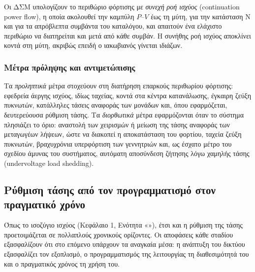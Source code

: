 Οι ΔΣΜ υπολογίζουν το περιθώριο φόρτισης με \emph{συνεχή ροή ισχύος} (continuation power
flow), η οποία ακολουθεί την καμπύλη $P$--$V$ έως τη μύτη, για την κατάσταση N και για τα
απρόβλεπτα συμβάντα του καταλόγου, και απαιτούν ένα ελάχιστο περιθώριο να διατηρείται και μετά
από κάθε συμβάν. Η συνήθης ροή ισχύος αποκλίνει κοντά στη μύτη, ακριβώς επειδή ο ιακωβιανός
γίνεται ιδιάζων.

\subsubsection{Μέτρα πρόληψης και αντιμετώπισης}

Τα \emph{προληπτικά} μέτρα στοχεύουν στη διατήρηση επαρκούς περιθωρίου φόρτισης: εφεδρεία
άεργης ισχύος, ιδίως ταχείας, κοντά στα κέντρα κατανάλωσης, έγκαιρη ζεύξη πυκνωτών, κατάλληλες
τάσεις αναφοράς των μονάδων και, όπου εφαρμόζεται, δευτερεύουσα ρύθμιση τάσης. Τα
\emph{διορθωτικά} μέτρα εφαρμόζονται όταν το σύστημα πλησιάζει το όριο: αναστολή των χειρισμών
ή μείωση της τάσης αναφοράς των μεταγωγέων λήψεων, ώστε να διακοπεί η αποκατάσταση του
φορτίου, ταχεία ζεύξη πυκνωτών, βραχυχρόνια υπερφόρτιση των γεννητριών και, ως έσχατο μέτρο του
σχεδίου άμυνας του συστήματος, αυτόματη αποσύνδεση ζήτησης λόγω χαμηλής τάσης (undervoltage
load shedding).

\subsection{Ρύθμιση τάσης από τον προγραμματισμό στον πραγματικό χρόνο}
\label{sec:v-stages}

Όπως το ισοζύγιο ισχύος (Κεφάλαιο 1, Ενότητα «»), έτσι και η ρύθμιση της
τάσης προετοιμάζεται σε πολλαπλούς χρονικούς ορίζοντες. Οι αποφάσεις κάθε σταδίου εξασφαλίζουν
ότι στο επόμενο υπάρχουν τα αναγκαία μέσα: η ανάπτυξη του δικτύου εξασφαλίζει τον εξοπλισμό, ο
προγραμματισμός της λειτουργίας τη διαθεσιμότητά του και ο πραγματικός χρόνος τη χρήση του.

